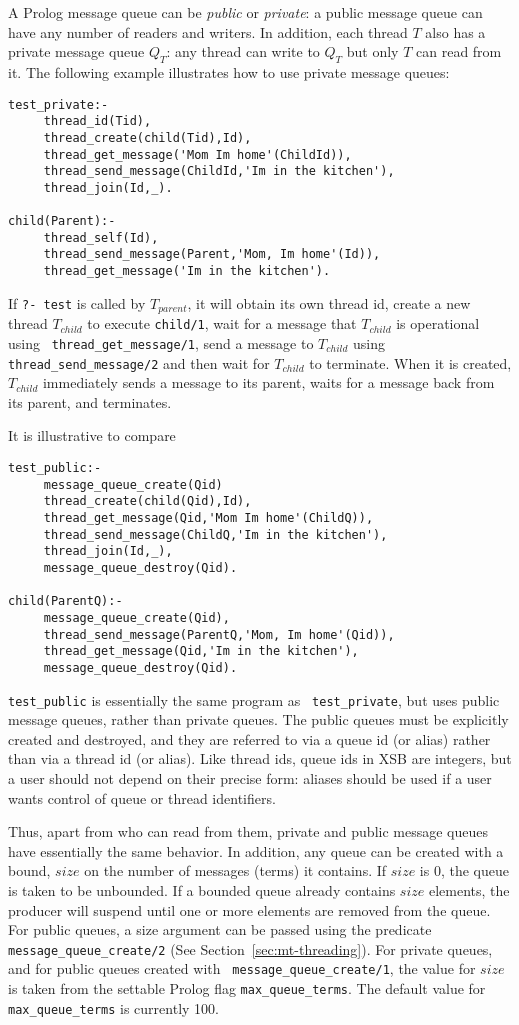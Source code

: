 A Prolog message queue can be {\em public} or {\em private}: a public
message queue can have any number of readers and writers.  In
addition, each thread $T$ also has a private message queue $Q_{T}$:
any thread can write to $Q_{T}$ but only $T$ can read from it.  The
following example illustrates how to use private message queues:
%
\begin{verbatim}
test_private:- 
     thread_id(Tid),
     thread_create(child(Tid),Id),
     thread_get_message('Mom Im home'(ChildId)),
     thread_send_message(ChildId,'Im in the kitchen'),
     thread_join(Id,_).

child(Parent):- 
     thread_self(Id),
     thread_send_message(Parent,'Mom, Im home'(Id)),
     thread_get_message('Im in the kitchen').
\end{verbatim}
%
If {\tt ?- test} is called by $T_{parent}$, it will obtain its own
thread id, create a new thread $T_{child}$ to execute {\tt child/1},
wait for a message that $T_{child}$ is operational using {\tt
  thread\_get\_message/1}, send a message to $T_{child}$ using {\tt
  thread\_send\_message/2} and then wait for $T_{child}$ to terminate.
  When it is created, $T_{child}$ immediately sends a message to its
  parent, waits for a message back from its parent, and terminates.
%

It is illustrative to compare 
\begin{verbatim}
test_public:- 
     message_queue_create(Qid)
     thread_create(child(Qid),Id),
     thread_get_message(Qid,'Mom Im home'(ChildQ)),
     thread_send_message(ChildQ,'Im in the kitchen'),
     thread_join(Id,_),
     message_queue_destroy(Qid).

child(ParentQ):- 
     message_queue_create(Qid),
     thread_send_message(ParentQ,'Mom, Im home'(Qid)),
     thread_get_message(Qid,'Im in the kitchen'),
     message_queue_destroy(Qid).
\end{verbatim}
%
{\tt test\_public} is essentially the same program as {\tt
  test\_private}, but uses public message queues, rather than private
queues.  The public queues must be explicitly created and destroyed,
and they are referred to via a queue id (or alias) rather than via a
thread id (or alias).  Like thread ids, queue ids in XSB are integers,
but a user should not depend on their precise form: aliases should be
used if a user wants control of queue or thread identifiers.

Thus, apart from who can read from them, private and public message
queues have essentially the same behavior.  In addition, any queue can
be created with a bound, $size$ on the number of messages (terms) it
contains.  If $size$ is 0, the queue is taken to be unbounded.  If a
bounded queue already contains $size$ elements, the producer will
suspend until one or more elements are removed from the queue.  For
public queues, a size argument can be passed using the predicate {\tt
  message\_queue\_create/2} (See Section~\ref{sec:mt-threading}).  For
private queues, and for public queues created with {\tt
  message\_queue\_create/1}, the value for $size$ is taken from the
settable Prolog flag {\tt max\_queue\_terms}.  The default value for {\tt
  max\_queue\_terms} is currently 100.

